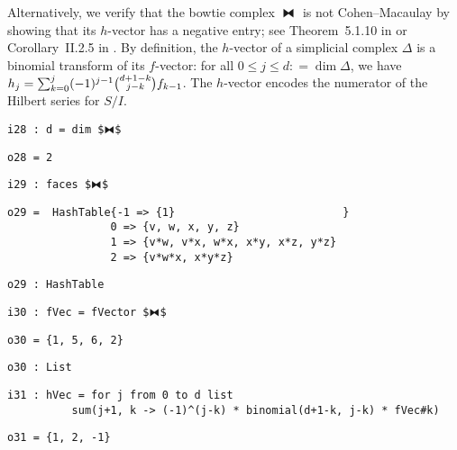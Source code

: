 \documentclass[12pt,leqno]{amsart}
\theoremstyle{definition}
\newcommand{\colequal}{\ensuremath{:\!=}}
\begin{document}
Alternatively, we verify that the bowtie complex $⧓$ is not Cohen--Macaulay by
showing that its $h$-vector has a negative entry; see Theorem~5.1.10 in
\cite{BH} or Corollary~II.2.5 in \cite{Stanley}.  By definition, the
$h$-vector of a simplicial complex $\Delta$ is a binomial transform of its
$f\!$-vector: for all $0 \leqslant j \leqslant d \colequal \dim \Delta$, we have
$h_j = \sum_{k=0}^{j} (-1)^{j-1}
\smash{\tbinom{d+1-k}{\raisebox{3pt}{$\scriptstyle j-k$}}} f_{k-1}$.  The
$h$-vector encodes the numerator of the Hilbert series for $S/I$.
\begin{lstlisting}[xleftmargin=10pt, aboveskip=5.0pt, belowskip=1.5pt]
i28 : d = dim $⧓$
\end{lstlisting}
\begin{lstlisting}[xleftmargin=10pt, aboveskip=1.5pt, belowskip=1.5pt]
o28 = 2
\end{lstlisting}
\begin{lstlisting}[xleftmargin=10pt, aboveskip=1.5pt, belowskip=1.5pt]
i29 : faces $⧓$
\end{lstlisting}
\begin{lstlisting}[xleftmargin=10pt, lineskip=-10pt, aboveskip=4pt, belowskip=1pt]
o29 =  HashTable{-1 => {1}                          }
                0 => {v, w, x, y, z}
                1 => {v*w, v*x, w*x, x*y, x*z, y*z}
                2 => {v*w*x, x*y*z}
\end{lstlisting}
\begin{lstlisting}[xleftmargin=10pt, aboveskip=1.5pt, belowskip=1.5pt]
o29 : HashTable
\end{lstlisting}
\begin{lstlisting}[xleftmargin=10pt, aboveskip=1.5pt, belowskip=1.5pt]
i30 : fVec = fVector $⧓$
\end{lstlisting}
\begin{lstlisting}[xleftmargin=10pt, aboveskip=1.5pt, belowskip=1.5pt]
o30 = {1, 5, 6, 2}
\end{lstlisting}
\begin{lstlisting}[xleftmargin=10pt, aboveskip=1.5pt, belowskip=1.5pt]
o30 : List
\end{lstlisting}
\begin{lstlisting}[xleftmargin=10pt, lineskip=-10pt, aboveskip=4pt, belowskip=1pt]
i31 : hVec = for j from 0 to d list 
          sum(j+1, k -> (-1)^(j-k) * binomial(d+1-k, j-k) * fVec#k)
\end{lstlisting}
\vfill
\begin{lstlisting}[xleftmargin=10pt, aboveskip=1.5pt, belowskip=1.5pt]
o31 = {1, 2, -1}
\end{lstlisting}
\end{document}

